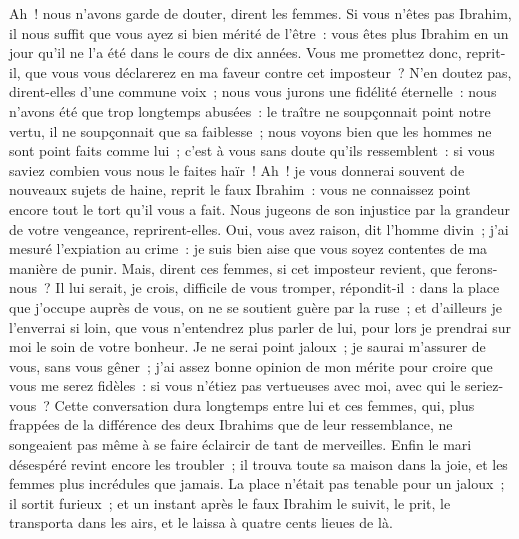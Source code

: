 \documentclass[french,twoside]{book} %
\begin{document}
Ah ! nous n’avons garde de douter, dirent les femmes. Si vous n’êtes pas Ibrahim, il nous suffit que vous ayez si bien mérité de l’être : vous êtes plus Ibrahim en un jour qu’il ne l’a été dans le cours de dix années. Vous me promettez donc, reprit-il, que vous vous déclarerez en ma faveur contre cet imposteur ? N’en doutez pas, dirent-elles d’une commune voix ; nous vous jurons une fidélité éternelle : nous n’avons été que trop longtemps abusées : le traître ne soupçonnait point notre vertu, il ne soupçonnait que sa faiblesse ; nous voyons bien que les hommes ne sont point faits comme lui ; c’est à vous sans doute qu’ils ressemblent : si vous saviez combien vous nous le faites haïr ! Ah ! je vous donnerai souvent de nouveaux sujets de haine, reprit le faux Ibrahim : vous ne connaissez point encore tout le tort qu’il vous a fait. Nous jugeons de son injustice par la grandeur de votre vengeance, reprirent-elles. Oui, vous avez raison, dit l’homme divin ; j’ai mesuré l’expiation au crime : je suis bien aise que vous soyez contentes de ma manière de punir. Mais, dirent ces femmes, si cet imposteur revient, que ferons-nous ? Il lui serait, je crois, difficile de vous tromper, répondit-il : dans la place que j’occupe auprès de vous, on ne se soutient guère par la ruse ; et d’ailleurs je l’enverrai si loin, que vous n’entendrez plus parler de lui, pour lors je prendrai sur moi le soin de votre bonheur. Je ne serai point jaloux ; je saurai m’assurer de vous, sans vous gêner ; j’ai assez bonne opinion de mon mérite pour croire que vous me serez fidèles : si vous n’étiez pas vertueuses avec moi, avec qui le seriez-vous ? Cette conversation dura longtemps entre lui et ces femmes, qui, plus frappées de la différence des deux Ibrahims que de leur ressemblance, ne songeaient pas même à se faire éclaircir de tant de merveilles. Enfin le mari désespéré revint encore les troubler ; il trouva toute sa maison dans la joie, et les femmes plus incrédules que jamais. La place n’était pas tenable pour un jaloux ; il sortit furieux ; et un instant après le faux Ibrahim le suivit, le prit, le transporta dans les airs, et le laissa à quatre cents lieues de là.\par
\end{document}
